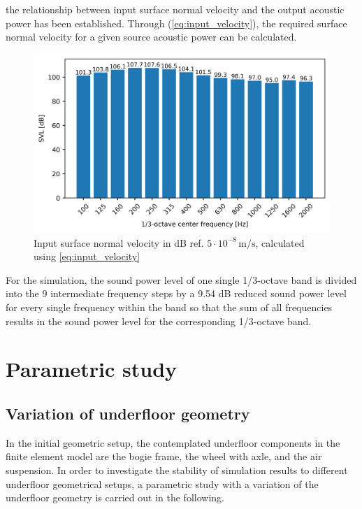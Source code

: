 the relationship between input surface normal velocity and the output acoustic power has been established. Through (\ref{eq:input_velocity}), the required surface normal velocity for a given source acoustic power can be calculated.

\begin{figure}[H]
	\centering
	\includegraphics{fig/chap4/input_SVL.png}
	\caption{Input surface normal velocity in dB ref. $5\cdot10^{-8}\,\text{m/s}$, calculated using \ref{eq:input_velocity}}
\end{figure}

For the simulation, the sound power level of one single 1/3-octave band is divided into the 9 intermediate frequency steps by a 9.54 dB reduced sound power level for every single frequency within the band so that the sum of all frequencies results in the sound power level for the corresponding 1/3-octave band.




\newpage
\section{Parametric study}
\label{section:parametric_study}
\subsection{Variation of underfloor geometry}
\label{section:variation_geometry}

In the initial geometric setup, the contemplated underfloor components in the finite element model are the bogie frame, the wheel with axle, and the air suspension. In order to investigate the stability of simulation results to different underfloor geometrical setups, a parametric study with a variation of the underfloor geometry is carried out in the following.

